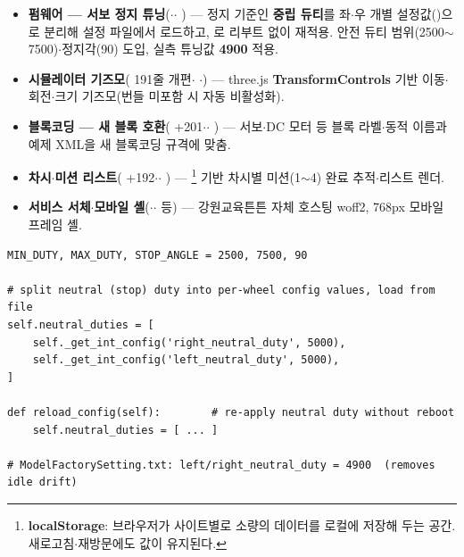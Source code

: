\begin{itemize}
  \item \textbf{펌웨어 --- 서보 정지 튜닝}($\cdot$$\cdot$%
  ) — 정지 기준인 \textbf{중립 듀티}를 좌$\cdot$우 개별
  설정값()으로 분리해 설정 파일에서 로드하고, 로
  리부트 없이 재적용. 안전 듀티 범위(2500$\sim$7500)$\cdot$정지각(90) 도입, 실측 튜닝값 \textbf{4900} 적용.
  \item \textbf{시뮬레이터 기즈모}( 191줄 개편$\cdot$%
  $\cdot$) — three.js \textbf{TransformControls} 기반
  이동$\cdot$회전$\cdot$크기 기즈모(번들 미포함 시 자동 비활성화).
  \item \textbf{블록코딩 --- 새 블록 호환}( +201$\cdot$$\cdot$%
  ) — 서보$\cdot$DC 모터 등 블록 라벨$\cdot$동적 이름과 예제 XML을 새 블록코딩 규격에 맞춤.
  \item \textbf{차시$\cdot$미션 리스트}( +192$\cdot$$\cdot$%
  ) — \footnote{\textbf{localStorage}: 브라우저가 사이트별로 소량의 데이터를 로컬에 저장해 두는 공간. 새로고침$\cdot$재방문에도 값이 유지된다.} 기반 차시별 미션(1$\sim$4) 완료 추적$\cdot$리스트 렌더.
  \item \textbf{서비스 서체$\cdot$모바일 셸}($\cdot$$\cdot$%
   등) — 강원교육튼튼 자체 호스팅 woff2, 768px 모바일 프레임 셸.
\end{itemize}

\begin{verbatim}
MIN_DUTY, MAX_DUTY, STOP_ANGLE = 2500, 7500, 90

# split neutral (stop) duty into per-wheel config values, load from file
self.neutral_duties = [
    self._get_int_config('right_neutral_duty', 5000),
    self._get_int_config('left_neutral_duty', 5000),
]

def reload_config(self):        # re-apply neutral duty without reboot
    self.neutral_duties = [ ... ]

# ModelFactorySetting.txt: left/right_neutral_duty = 4900  (removes idle drift)
\end{verbatim}

